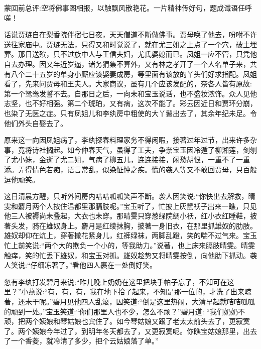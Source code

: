 

\begin{parag}
    \begin{note}蒙回前总评:空将佛事图相报，以触飘风散艳花。一片精神传好句，题成谶语任呼嗟！\end{note}
\end{parag}


\begin{parag}
    话说贾琏自在梨香院伴宿七日夜，天天僧道不断做佛事。贾母唤了他去，吩咐不许送往家庙中。贾琏无法，只得又和时觉说了，就在尤三姐之上点了一个穴，破土埋葬。那日送殡，只不过族中人与王信夫妇，尤氏婆媳而已。凤姐一应不管，只凭他自去办理。因又年近岁逼，诸务猬集不算外，又有林之孝开了一个人名单子来，共有八个二十五岁的单身小厮应该娶妻成房，等里面有该放的丫头们好求指配。凤姐看了，先来问贾母和王夫人。大家商议，虽有几个应该发配的，奈各人皆有原故:第一个鸳鸯发誓不去。自那日之后，一向未和宝玉说话，也不盛妆浓饰。众人见他志坚，也不好相强。第二个琥珀，又有病，这次不能了。彩云因近日和贾环分崩，也染了无医之症。只有凤姐儿和李纨房中粗使的大丫鬟出去了，其余年纪未足。令他们外头自娶去了。
\end{parag}


\begin{parag}
    原来这一向因凤姐病了，李纨探春料理家务不得闲暇，接著过年过节，出来许多杂事，竟将诗社搁起。如今仲春天气，虽得了工夫，争奈宝玉因冷遁了柳湘莲，剑刎了尤小妹，金逝了尤二姐，气病了柳五儿，连连接接，闲愁胡恨，一重不了一重添。弄得情色若痴，语言常乱，似染怔忡之疾。慌的袭人等又不敢回贾母，只百般逗他顽笑。
\end{parag}


\begin{parag}
    这日清晨方醒，只听外间房内咭咭呱呱笑声不断。袭人因笑说:“你快出去解救，晴雯和麝月两个人按住温都里那膈肢呢。”宝玉听了，忙披上灰鼠袄子出来一瞧，只见他三人被褥尚未叠起，大衣也未穿。那晴雯只穿葱绿院绸小袄，红小衣红睡鞋，披著头发，骑在雄奴身上。麝月是红绫抹胸，披著一身旧衣，在那里抓雄奴的肋肢。雄奴却仰在炕上，穿著撒花紧身儿，红裤绿袜，两脚乱蹬，笑的喘不过气来。宝玉忙上前笑说:“两个大的欺负一个小的，等我助力。”说著，也上床来膈肢晴雯。晴雯触痒，笑的忙丢下雄奴，和宝玉对抓。雄奴趁势又将晴雯按倒，向他肋下抓动。袭人笑说:“仔细冻著了。”看他四人裹在一处倒好笑。
\end{parag}


\begin{parag}
    忽有李纨打发碧月来说:“昨儿晚上奶奶在这里把块手帕子忘了，不知可在这里？”小燕说:“有，有，有，我在地下拾了起来，不知是那一位的，才洗了出来晾著，还未干呢。”碧月见他四人乱滚，因笑道:“倒是这里热闹，大清早起就咭咭呱呱的顽到一处。”宝玉笑道:“你们那里人也不少，怎么不顽？”碧月道: “我们奶奶不顽，把两个姨娘和琴姑娘也宾住了。如今琴姑娘又跟了老太太前头去了，更寂寞了。两个姨娘今年过了，到明年冬天都去了，又更寂寞呢。你瞧宝姑娘那里，出去了一个香菱，就冷清了多少，把个云姑娘落了单。”
\end{parag}


